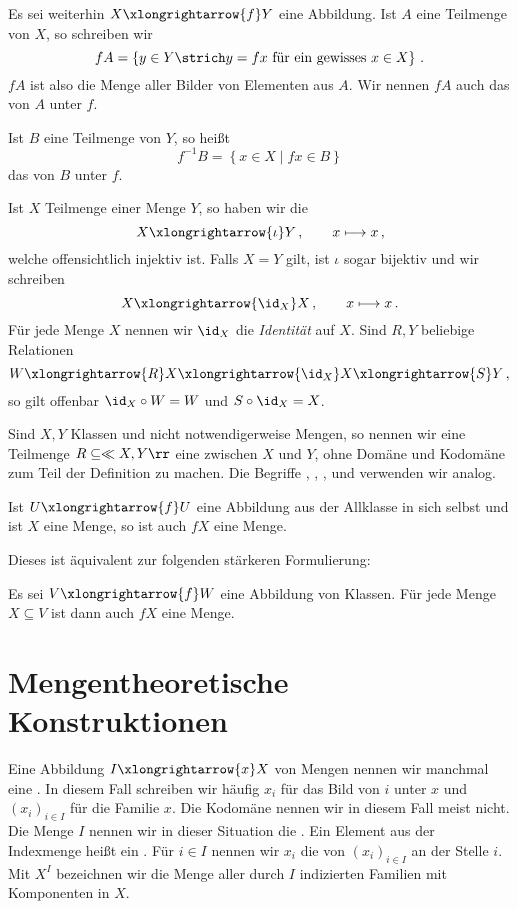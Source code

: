 Es sei weiterhin $X\xlongrightarrow{f}Y$ eine Abbildung. Ist $A$ eine Teilmenge von $X$, so schreiben wir 
\[fA=\left\{y\in Y\strich y=fx\text{ für ein gewisses }x\in X\right\}\,.\]
$fA$ ist also die Menge aller Bilder von Elementen aus $A$. Wir nennen $fA$ auch das  von $A$ unter $f$.

Ist $B$ eine Teilmenge von $Y$, so heißt
\[
f^{-1}B=\left\{x\in X\mid fx\in B\right\}
\]
das  von $B$ unter $f$.

\begin{example}
Ist $X$ Teilmenge einer Menge $Y$, so haben wir die 
\[
X\xlongrightarrow{\iota}Y\,,\qquad x\longmapsto x\,,
\]
welche offensichtlich injektiv ist. Falls $X=Y$ gilt, ist $\iota$ sogar bijektiv und wir schreiben
\[
X\xlongrightarrow{\id_X}X\,,\qquad x\longmapsto x\,.
\]
Für jede Menge $X$ nennen wir $\id_X$ die \emph{Identität} auf $X$. Sind $R,Y$ beliebige Relationen
\[
W\xlongrightarrow{R}X\xlongrightarrow{\id_X}X\xlongrightarrow{S}Y\,,
\]
so gilt offenbar $\id_X\circ W=W$ und $S\circ\id_X=X$.
\end{example}

Sind $X,Y$ Klassen und nicht notwendigerweise Mengen, so nennen wir eine Teilmenge $R\subseteq\ll X,Y\rr$ eine  zwischen $X$ und $Y$, ohne Domäne und Kodomäne zum Teil der Definition zu machen. Die Begriffe , , ,  und  verwenden wir analog.

\begin{axiom}
Ist $U\xlongrightarrow{f}U$ eine Abbildung aus der Allklasse in sich selbst und ist $X$ eine Menge, so ist auch $fX$ eine Menge.
\end{axiom}

Dieses  ist äquivalent zur folgenden stärkeren Formulierung:

\begin{task}
Es sei $V\xlongrightarrow{f}W$ eine Abbildung von Klassen. Für jede Menge $X\subseteq V$ ist dann auch $fX$ eine Menge. 
\end{task}

\section{Mengentheoretische Konstruktionen}

Eine Abbildung $I\xlongrightarrow{x}X$ von Mengen nennen wir manchmal eine . In diesem Fall schreiben wir häufig $x_i$ für das Bild von $i$ unter $x$ und $(x_i)_{i\in I}$ für die Familie $x$. Die Kodomäne nennen wir in diesem Fall meist nicht. Die Menge $I$ nennen wir in dieser Situation die . Ein Element aus der Indexmenge heißt ein . Für $i\in I$ nennen wir $x_i$ die  von $(x_i)_{i\in I}$ an der Stelle $i$. Mit $X^I$ bezeichnen wir die Menge aller durch $I$ indizierten Familien mit Komponenten in $X$. 

